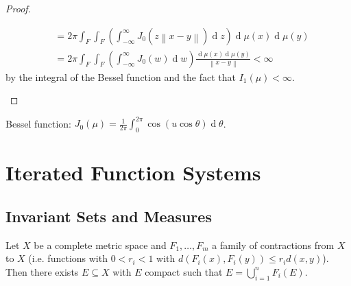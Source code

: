 \documentclass[11pt, a4paper]{memoir}
\newcommand{\norm}[1]{\ensuremath{\left\lVert#1\right\rVert}}
\theoremstyle{change}
\theoremstyle{plain}
\theoremstyle{nonumberplain}
\newtheorem{proof}{Proof}
\renewcommand{\d}[1]{\ensuremath{\operatorname{d}\!{#1}}}
\numberwithin{equation}{section}
\begin{document}
\begin{proof}
\begin{enumerate}[nl,r]
\begin{align*}
                                                                                                &= 2\pi\int_F\int_F\left(\int_{-\infty}^\infty J_0(z\norm{x-y})\d{z}\right)\d{\mu(x)}\d{\mu(y)}\\
                                                                                                &= 2\pi\int_F\int_F\left(\int_{-\infty}^\infty J_0(w)\d{w}\right)\frac{\d{\mu(x)}\d{\mu(y)}}{\norm{x-y}}<\infty
            \end{align*}
            by the integral of the Bessel function and the fact that $I_1(\mu)<\infty$.
    \end{enumerate}
\end{proof}
Bessel function: $J_0(\mu)=\frac{1}{2\pi}\int_0^{2\pi}\cos(u\cos\theta)\d{\theta}$.
\section{Iterated Function Systems}
\subsection{Invariant Sets and Measures}
Let $X$ be a complete metric space and $F_1,\ldots,F_m$ a family of contractions from $X$ to $X$ (i.e. functions with $0<r_i<1$ with $d(F_i(x),F_i(y))\leq r_id(x,y)$).
Then there exists $E\subseteq X$ with $E$ compact such that $E=\bigcup_{i=1}^n F_i(E)$.
\end{document}
